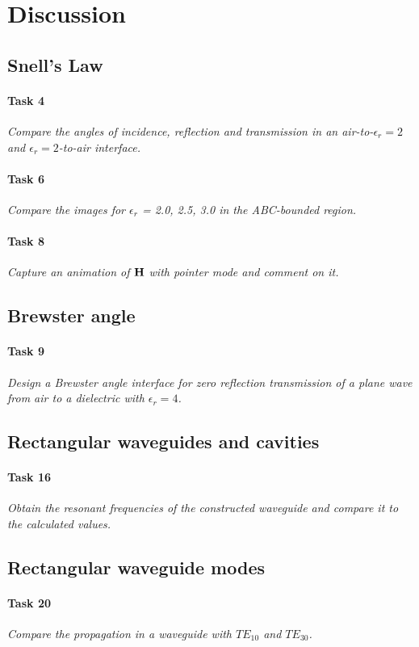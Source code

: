 \section{Discussion}\label{sec:discussion}
\subsection{Snell's Law}
\paragraph{Task 4}\textit{Compare the angles of incidence, reflection and transmission in an air-to-$\epsilon_r = 2$ and $\epsilon_r = 2$-to-air interface.}

\paragraph{Task 6}\textit{Compare the images for $\epsilon_r$ = 2.0, 2.5, 3.0 in the ABC-bounded region.}

\paragraph{Task 8}\textit{Capture an animation of $\mathbf{H}$ with pointer mode and comment on it.}

\subsection{Brewster angle}
\paragraph{Task 9}\textit{Design a Brewster angle interface for zero reflection transmission of a plane wave from air to a dielectric with $\epsilon_r = 4$.}

\subsection{Rectangular waveguides and cavities}
\paragraph{Task 16}\textit{Obtain the resonant frequencies of the constructed waveguide and compare it to the calculated values.}

\subsection{Rectangular waveguide modes}
\paragraph{Task 20}\textit{Compare the propagation in a waveguide with $TE_{10}$ and $TE_{30}$.}

